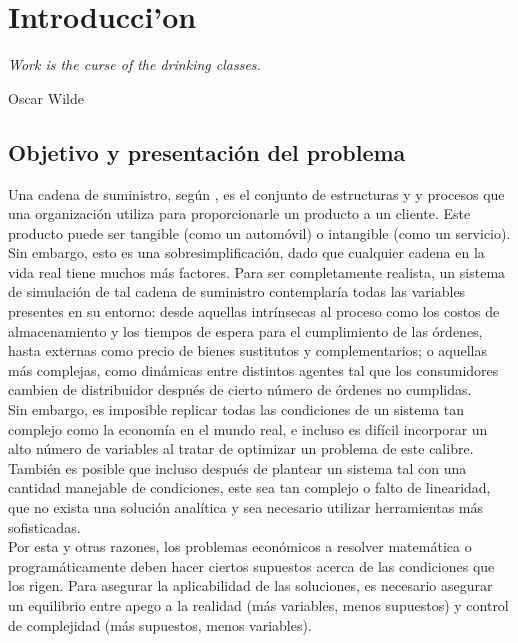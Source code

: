 \chapter{Introducci'on}

\textit{Work is the curse of the drinking classes.}
\begin{flushright}
 Oscar Wilde
 \end{flushright}

\vspace{10 pt}

\section{Objetivo y presentaci\'on del problema}


Una cadena de suministro, seg\'un \citet{Sterman}, es el conjunto de estructuras y y procesos que una organizaci\'on utiliza para proporcionarle un producto a un cliente. Este producto puede ser tangible (como un autom\'ovil) o intangible (como un servicio). Sin embargo, esto es una sobresimplificaci\'on, dado que cualquier cadena en la vida real tiene muchos m\'as factores. Para ser completamente realista, un sistema de simulaci\'on de tal cadena de suministro contemplar\'ia todas las variables presentes en su entorno: desde aquellas intr\'insecas al proceso como los costos de almacenamiento y los tiempos de espera para el cumplimiento de las \'ordenes, hasta externas como precio de bienes sustitutos y complementarios; o aquellas m\'as complejas, como din\'amicas entre distintos agentes tal que los consumidores cambien de distribuidor despu\'es de cierto n\'umero de \'ordenes no cumplidas.\\

Sin embargo, es imposible replicar todas las condiciones de un sistema tan complejo como la econom\'ia en el mundo real, e incluso es dif\'icil incorporar un alto n\'umero de variables al tratar de optimizar un problema de este calibre. Tambi\'en es posible que incluso despu\'es de plantear un sistema tal con una cantidad manejable de condiciones, este sea tan complejo o falto de linearidad, que no exista una soluci\'on anal\'itica y sea necesario utilizar herramientas m\'as sofisticadas.\\

Por esta y otras razones, los problemas econ\'omicos a resolver matem\'atica o program\'aticamente deben hacer ciertos supuestos acerca de las condiciones que los rigen. Para asegurar la aplicabilidad de las soluciones, es necesario asegurar un equilibrio entre apego a la realidad (m\'as variables, menos supuestos) y control de complejidad (m\'as supuestos, menos variables).\\


